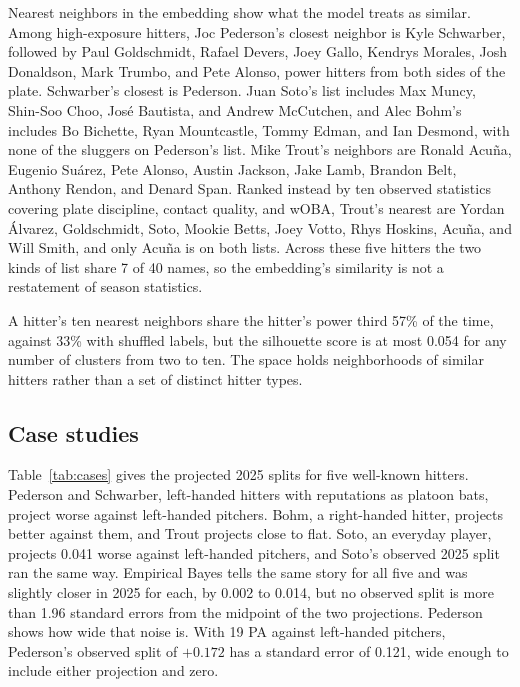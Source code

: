 \documentclass[11pt,letterpaper]{article}
\let\oldsubsection\subsection
\renewcommand\subsection{\FloatBarrier\oldsubsection}
\begin{document}
Nearest neighbors in the embedding show what the model treats as similar. Among high-exposure hitters, Joc Pederson's closest neighbor is Kyle Schwarber, followed by Paul Goldschmidt, Rafael Devers, Joey Gallo, Kendrys Morales, Josh Donaldson, Mark Trumbo, and Pete Alonso, power hitters from both sides of the plate. Schwarber's closest is Pederson. Juan Soto's list includes Max Muncy, Shin-Soo Choo, José Bautista, and Andrew McCutchen, and Alec Bohm's includes Bo Bichette, Ryan Mountcastle, Tommy Edman, and Ian Desmond, with none of the sluggers on Pederson's list. Mike Trout's neighbors are Ronald Acuña, Eugenio Suárez, Pete Alonso, Austin Jackson, Jake Lamb, Brandon Belt, Anthony Rendon, and Denard Span. Ranked instead by ten observed statistics covering plate discipline, contact quality, and wOBA, Trout's nearest are Yordan Álvarez, Goldschmidt, Soto, Mookie Betts, Joey Votto, Rhys Hoskins, Acuña, and Will Smith, and only Acuña is on both lists. Across these five hitters the two kinds of list share 7 of 40 names, so the embedding's similarity is not a restatement of season statistics.

A hitter's ten nearest neighbors share the hitter's power third 57\% of the time, against 33\% with shuffled labels, but the silhouette score is at most 0.054 for any number of clusters from two to ten. The space holds neighborhoods of similar hitters rather than a set of distinct hitter types.

\subsection{Case studies}
\label{sec:anchors}\label{sec:disagree}

Table~\ref{tab:cases} gives the projected 2025 splits for five well-known hitters. Pederson and Schwarber, left-handed hitters with reputations as platoon bats, project worse against left-handed pitchers. Bohm, a right-handed hitter, projects better against them, and Trout projects close to flat. Soto, an everyday player, projects 0.041 worse against left-handed pitchers, and Soto's observed 2025 split ran the same way. Empirical Bayes tells the same story for all five and was slightly closer in 2025 for each, by 0.002 to 0.014, but no observed split is more than 1.96 standard errors from the midpoint of the two projections. Pederson shows how wide that noise is. With 19 PA against left-handed pitchers, Pederson's observed split of $+0.172$ has a standard error of 0.121, wide enough to include either projection and zero.
\end{document}
